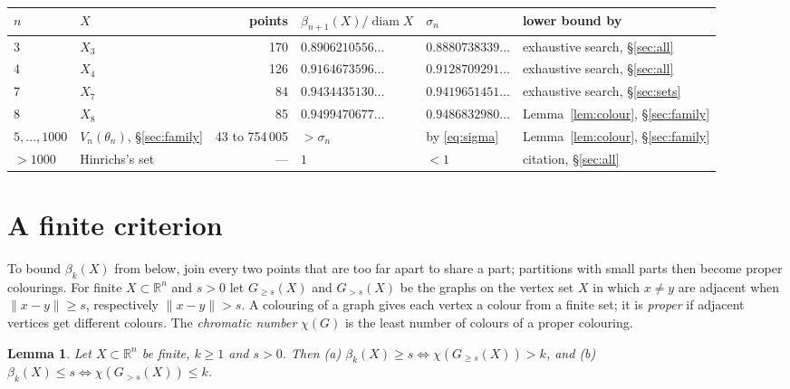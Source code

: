 \documentclass[10pt,a4paper,reqno]{amsart}
\newtheorem{lemma}{Lemma}
\newcommand{\R}{\mathbb R}
\DeclareMathOperator{\diam}{diam}
\begin{document}
\begin{center}\small
{}\label{tab:main}
\setlength{\tabcolsep}{4pt}
\begin{tabular}{@{}llrlll@{}}
\toprule
$n$ & $X$ & points & $\beta_{n+1}(X)/\diam X$ & $\sigma_n$ & lower bound by\\
\midrule
3 & $X_3$ & 170 & $0.8906210556\ldots$ & $0.8880738339\ldots$ & exhaustive search, \S\ref{sec:all}\\
4 & $X_4$ & 126 & $0.9164673596\ldots$ & $0.9128709291\ldots$ & exhaustive search, \S\ref{sec:all}\\
7 & $X_7$ & 84 & $0.9434435130\ldots$ & $0.9419651451\ldots$ & exhaustive search, \S\ref{sec:sets}\\
8 & $X_8$ & 85 & $0.9499470677\ldots$ & $0.9486832980\ldots$ & Lemma~\ref{lem:colour}, \S\ref{sec:family}\\
$5,\dots,1000$ & $V_n(\theta_n)$, \S\ref{sec:family} & 43 to 754\,005 & $>\sigma_n$ & by \eqref{eq:sigma} & Lemma~\ref{lem:colour}, \S\ref{sec:family}\\
$>1000$ & Hinrichs's set~\cite{Hi02} & --- & $1$ & $<1$ & citation, \S\ref{sec:all}\\
\bottomrule
\end{tabular}
\end{center}

\section{A finite criterion}\label{sec:crit}

To bound $\beta_k(X)$ from below, join every two points that are too far apart to share a part; partitions with small parts then become proper colourings. For finite $X\subset\R^n$ and $s>0$ let $G_{\ge s}(X)$ and $G_{>s}(X)$ be the graphs on the vertex set $X$ in which $x\ne y$ are adjacent when $\|x-y\|\ge s$, respectively $\|x-y\|>s$. A colouring of a graph gives each vertex a colour from a finite set; it is \emph{proper} if adjacent vertices get different colours. The \emph{chromatic number} $\chi(G)$ is the least number of colours of a proper colouring.

\begin{lemma}\label{lem:crit}
Let $X\subset\R^n$ be finite, $k\ge 1$ and $s>0$. Then
\textup{(a)} $\beta_k(X)\ge s\iff\chi(G_{\ge s}(X))>k$, and
\textup{(b)} $\beta_k(X)\le s\iff\chi(G_{>s}(X))\le k$.
\end{lemma}
\end{document}

